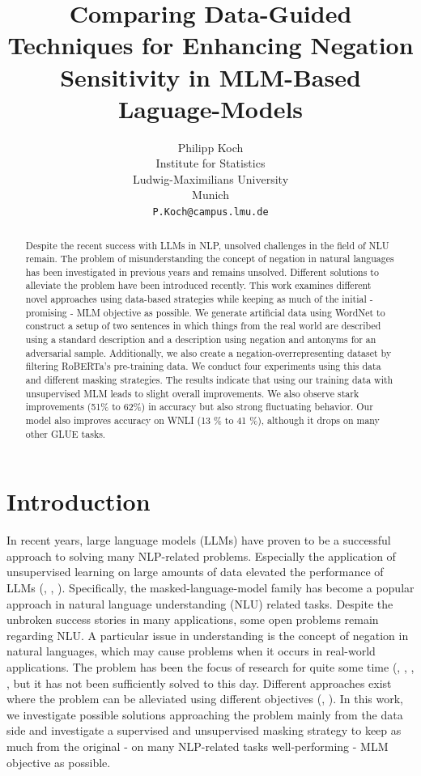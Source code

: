 \documentclass{article}
\title{Comparing Data-Guided Techniques for Enhancing Negation Sensitivity in MLM-Based Laguage-Models
}
\author{%
  Philipp Koch
    \\
  Institute for Statistics\\
  Ludwig-Maximilians University\\
  Munich\\
  \texttt{P.Koch@campus.lmu.de} \\
}
\begin{document}
\maketitle


\begin{abstract}
Despite the recent success with LLMs in NLP, unsolved challenges in the field of NLU remain. The problem of misunderstanding the concept of negation in natural languages has been investigated in previous years and remains unsolved. Different solutions to alleviate the problem have been introduced recently. This work examines different novel approaches using data-based strategies while keeping as much of the initial - promising - MLM objective as possible. We generate artificial data using WordNet to construct a setup of two sentences in which things from the real world are described using a standard description and a description using negation and antonyms for an adversarial sample. Additionally, we also create a negation-overrepresenting dataset by filtering RoBERTa's pre-training data. We conduct four experiments using this data and different masking strategies. The results indicate that using our training data with unsupervised MLM leads to slight overall improvements. We also observe stark improvements (51\% to 62\%) in accuracy but also strong fluctuating behavior. Our model also improves accuracy on WNLI (13 \% to 41 \%), although it drops on many other GLUE tasks.
\end{abstract}


\section{Introduction}
\label{section:introduction}

In recent years, large language models  (LLMs) have proven to be a successful approach to solving many NLP-related problems. Especially the application of unsupervised learning on large amounts of data elevated the performance of LLMs (\cite{devlin-etal-2019-bert}, \cite{liu2019roberta}, \cite{brown2020language}). Specifically, the masked-language-model family has become a popular approach in natural language understanding (NLU) related tasks. Despite the unbroken success stories in many applications, some open problems remain regarding NLU. A particular issue in understanding is the concept of negation in natural languages, which may cause problems when it occurs in real-world applications. The problem has been the focus of research for quite some time (\cite{ettinger-2020-bert}, \cite{kassner-schutze-2020-negated}, \cite{hossain-etal-2020-analysis}, \cite{hossain-etal-2022-analysis}, but it has not been sufficiently solved to this day. Different approaches exist where the problem can be alleviated using different objectives (\cite{hosseini-etal-2021-understanding}, \cite{TruongImprovingNegation2022}). In this work, we investigate possible solutions approaching the problem mainly from the data side and investigate a supervised and unsupervised masking strategy to keep as much from the original - on many NLP-related tasks well-performing - MLM objective as possible.
\end{document}
